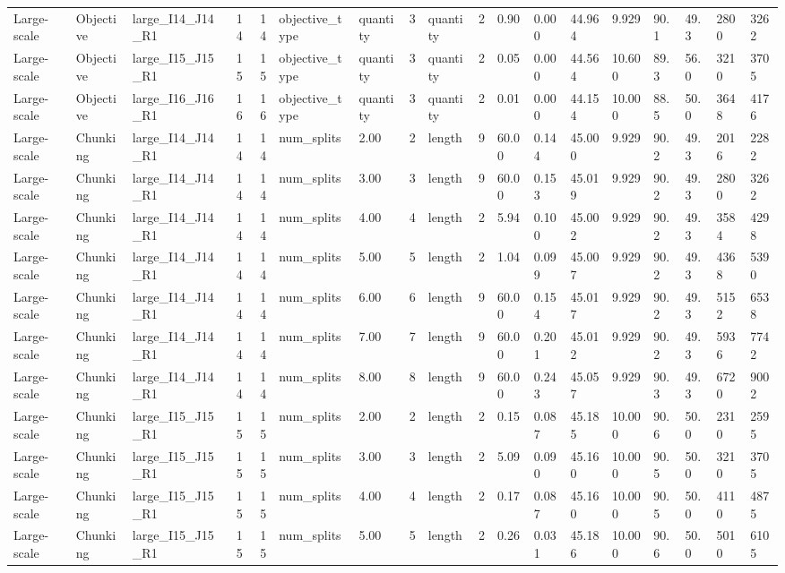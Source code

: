 \begin{longtable}{lllrrllllrllllllll}
Large-scale & Objective & large\_I14\_J14\_R1 & 14 & 14 & objective\_type & quantity & 3 & quantity & 2 & 0.90 & 0.000 & 44.964 & 9.929 & 90.1 & 49.3 & 2800 & 3262 \\
Large-scale & Objective & large\_I15\_J15\_R1 & 15 & 15 & objective\_type & quantity & 3 & quantity & 2 & 0.05 & 0.000 & 44.564 & 10.600 & 89.3 & 56.0 & 3210 & 3705 \\
Large-scale & Objective & large\_I16\_J16\_R1 & 16 & 16 & objective\_type & quantity & 3 & quantity & 2 & 0.01 & 0.000 & 44.154 & 10.000 & 88.5 & 50.0 & 3648 & 4176 \\
Large-scale & Chunking & large\_I14\_J14\_R1 & 14 & 14 & num\_splits & 2.00 & 2 & length & 9 & 60.00 & 0.144 & 45.000 & 9.929 & 90.2 & 49.3 & 2016 & 2282 \\
Large-scale & Chunking & large\_I14\_J14\_R1 & 14 & 14 & num\_splits & 3.00 & 3 & length & 9 & 60.00 & 0.153 & 45.019 & 9.929 & 90.2 & 49.3 & 2800 & 3262 \\
Large-scale & Chunking & large\_I14\_J14\_R1 & 14 & 14 & num\_splits & 4.00 & 4 & length & 2 & 5.94 & 0.100 & 45.002 & 9.929 & 90.2 & 49.3 & 3584 & 4298 \\
Large-scale & Chunking & large\_I14\_J14\_R1 & 14 & 14 & num\_splits & 5.00 & 5 & length & 2 & 1.04 & 0.099 & 45.007 & 9.929 & 90.2 & 49.3 & 4368 & 5390 \\
Large-scale & Chunking & large\_I14\_J14\_R1 & 14 & 14 & num\_splits & 6.00 & 6 & length & 9 & 60.00 & 0.154 & 45.017 & 9.929 & 90.2 & 49.3 & 5152 & 6538 \\
Large-scale & Chunking & large\_I14\_J14\_R1 & 14 & 14 & num\_splits & 7.00 & 7 & length & 9 & 60.00 & 0.201 & 45.012 & 9.929 & 90.2 & 49.3 & 5936 & 7742 \\
Large-scale & Chunking & large\_I14\_J14\_R1 & 14 & 14 & num\_splits & 8.00 & 8 & length & 9 & 60.00 & 0.243 & 45.057 & 9.929 & 90.3 & 49.3 & 6720 & 9002 \\
Large-scale & Chunking & large\_I15\_J15\_R1 & 15 & 15 & num\_splits & 2.00 & 2 & length & 2 & 0.15 & 0.087 & 45.185 & 10.000 & 90.6 & 50.0 & 2310 & 2595 \\
Large-scale & Chunking & large\_I15\_J15\_R1 & 15 & 15 & num\_splits & 3.00 & 3 & length & 2 & 5.09 & 0.090 & 45.160 & 10.000 & 90.5 & 50.0 & 3210 & 3705 \\
Large-scale & Chunking & large\_I15\_J15\_R1 & 15 & 15 & num\_splits & 4.00 & 4 & length & 2 & 0.17 & 0.087 & 45.160 & 10.000 & 90.5 & 50.0 & 4110 & 4875 \\
Large-scale & Chunking & large\_I15\_J15\_R1 & 15 & 15 & num\_splits & 5.00 & 5 & length & 2 & 0.26 & 0.031 & 45.186 & 10.000 & 90.6 & 50.0 & 5010 & 6105 \\

\end{longtable}
